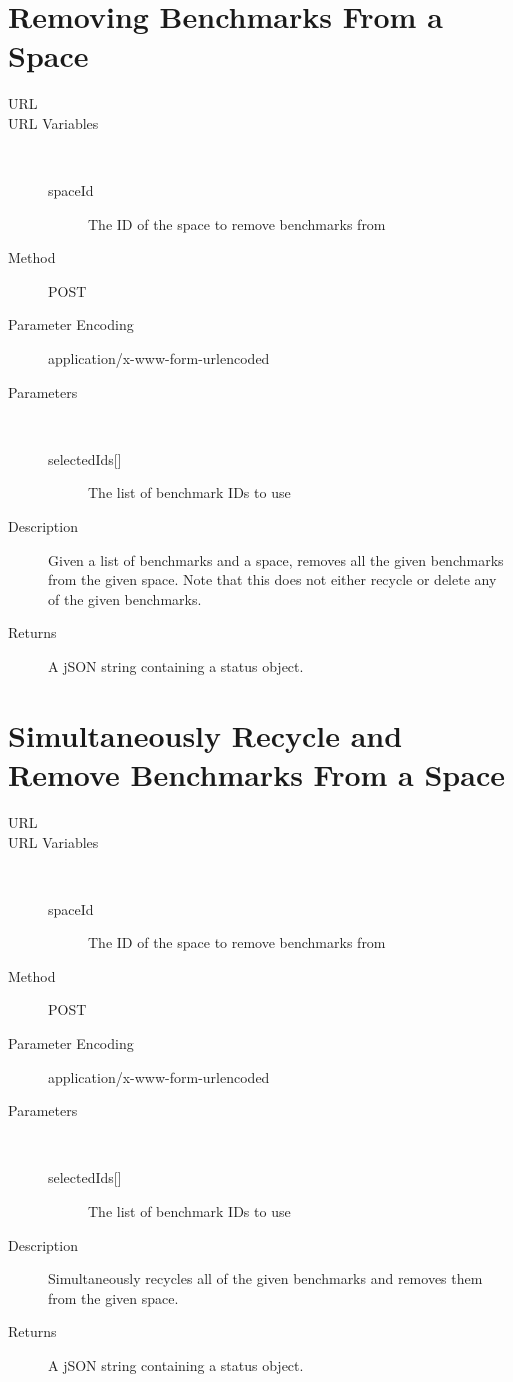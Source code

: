 \section{Removing Benchmarks From a Space }
\begin{description}
\item [URL] 
\item [URL Variables] \
	\begin{description}
	\item [spaceId]  The ID of the space to remove benchmarks from
	\end{description}
\item [Method] POST
\item [Parameter Encoding] application/x-www-form-urlencoded
\item [Parameters] \
	\begin{description}
	\item [{selectedIds[]}]  The list of benchmark IDs to use
	\end{description}
\item [Description] Given a list of benchmarks and a space, removes all the given benchmarks from the given space. Note that this does not either recycle or delete any of the given benchmarks.
\item [Returns] A jSON string containing a status object.
\end{description}


\section{Simultaneously Recycle and Remove Benchmarks From a Space}
\begin{description}
\item [URL] 
\item [URL Variables] \
	\begin{description}
	\item [spaceId] \type{Integer} The ID of the space to remove benchmarks from
	\end{description}
\item [Method] POST
\item [Parameter Encoding] application/x-www-form-urlencoded
\item [Parameters] \
	\begin{description}
	\item [{selectedIds[]}]  The list of benchmark IDs to use
	\end{description}
\item [Description] Simultaneously recycles all of the given benchmarks and removes them from the given space.
\item [Returns] A jSON string containing a status object.
\end{description}


